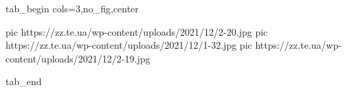  
 
 
 
 


\ifcmt
  tab_begin cols=3,no_fig,center

     pic https://zz.te.ua/wp-content/uploads/2021/12/2-20.jpg
		 pic https://zz.te.ua/wp-content/uploads/2021/12/1-32.jpg
		 pic https://zz.te.ua/wp-content/uploads/2021/12/2-19.jpg

  tab_end
\fi

